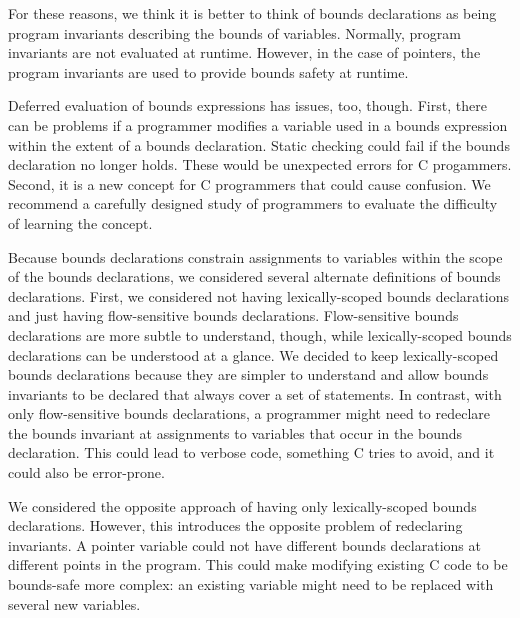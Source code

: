 For these reasons, we think it is better to think of bounds declarations as being
program invariants describing the bounds of variables.   Normally, 
program invariants are not evaluated at runtime.  However, in the case of pointers,
the program invariants are used to provide bounds safety at runtime.

Deferred evaluation of bounds expressions has issues, too, though. First, there
can be problems if a programmer modifies a variable used in a bounds expression
within the extent of a bounds declaration.  Static checking could fail if the
bounds declaration no longer holds.  These would be unexpected errors for
C progammers.  Second, it is a new concept for C programmers that could
cause confusion.  We recommend a carefully designed study of
programmers to evaluate the difficulty of learning the concept.

Because bounds declarations constrain assignments to variables within the scope
of the bounds declarations, we considered several alternate definitions of 
bounds declarations.   First, we considered not having lexically-scoped bounds
declarations and just having flow-sensitive bounds declarations.  Flow-sensitive
bounds declarations are more subtle to understand, though, while lexically-scoped
bounds declarations can be understood at a glance.  We decided to keep
lexically-scoped bounds declarations because they are simpler to understand and
allow bounds invariants to be declared that always cover a set of statements.
In contrast, with only flow-sensitive bounds declarations, a programmer might need 
to redeclare the bounds invariant at  assignments to variables that occur in the
bounds declaration. This could lead to verbose code, something C tries to
avoid, and it could also be error-prone.

We considered the opposite approach of having only lexically-scoped
bounds declarations.   However, this introduces the opposite problem of
redeclaring invariants.  A pointer variable could not have different
bounds declarations at different points in the program.  This could
make modifying existing C code to be bounds-safe more complex: an existing
variable might need to be replaced with several new variables.

